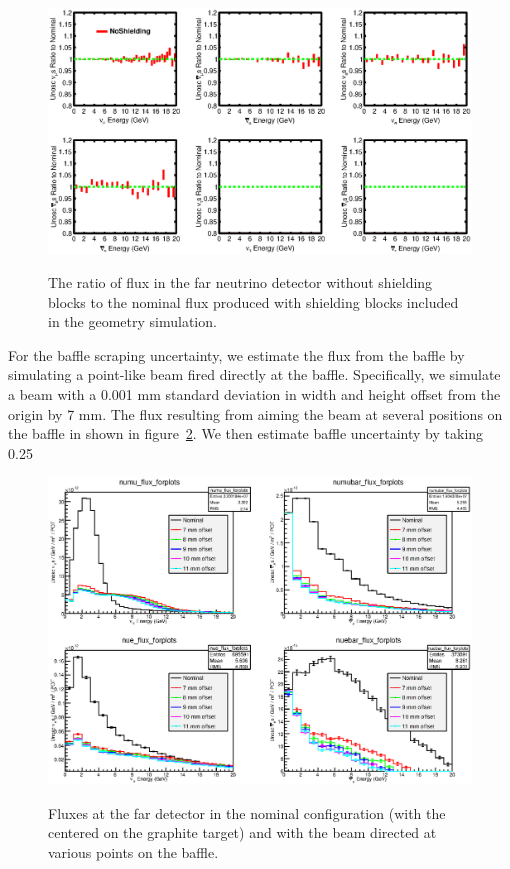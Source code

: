\begin{figure}[ht]
\label{fig:shielding_far}
  \begin{center}
    {\includegraphics[width=6.0in]{figures/comp_flux_ratios_FHC_unoscillated_Nominal_NoShielding_far.eps}}
  \end{center}
\caption{ The ratio of flux in the far neutrino detector without shielding blocks to the nominal flux produced with shielding blocks included in the geometry simulation. }
\end{figure}

For the baffle scraping uncertainty, we estimate the flux from the baffle by simulating a point-like beam fired directly at the baffle. Specifically, we simulate a beam with a 0.001 mm standard deviation in width and height offset from the origin by 7 mm.  The flux resulting from aiming the beam at several positions on the baffle in shown in figure~\ref{fig:baffle_flux}.  We then estimate baffle uncertainty by taking 0.25%

\begin{figure}[ht]
\label{fig:baffle_flux}
  \begin{center}
    {\includegraphics[width=6.0in]{figures/baffle_flux.eps}}
  \end{center}
\caption{ Fluxes at the far detector in the nominal configuration (with the centered on the graphite target) and with the beam directed at various points on the baffle. }
\end{figure}

